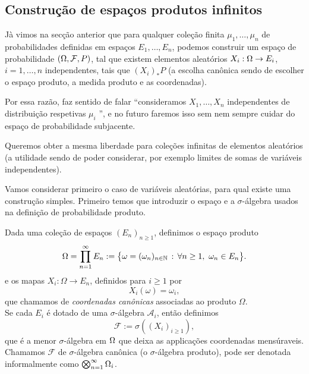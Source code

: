 \begin{topics}


\section{Construção de espaços produtos infinitos}


Jà vimos na secção anterior que para qualquer coleção finita  $\mu_1,\dots,\mu_n$ de probabilidades definidas em espaços
$E_1,\dots,E_n$, podemos construir um espaço de probabilidade $(\Omega,{\mathcal F},P)$, tal que existem elementos aleatórios $X_i:\Omega\to E_i$,
$i=1,\dots,n$ independentes, tais que $(X_i)_*P$ (a escolha canônica sendo de escolher o espaço produto, a medida produto e as coordenadas).

\medskip

Por essa razão, faz sentido de falar ``consideramos $X_1,\dots,X_n$ independentes de distribuição respetivas $\mu_i$ '', e
no futuro faremos isso sem nem sempre cuidar do
espaço de probabilidade subjacente.

\medskip

Queremos obter a mesma liberdade para coleções infinitas de elementos aleatórios
(a utilidade sendo de poder considerar, por exemplo limites de somas de variáveis independentes).

\medskip

Vamos considerar primeiro o caso de variáveis aleatórias, para qual existe uma construção simples.
Primeiro temos que introduzir o espaço e a $\sigma$-álgebra usados na definição de probabilidade produto.

\begin{definition}
Dada uma coleção de espaços $(E_n)_{n\ge 1}$, definimos o espaço produto
\begin{equation}
  \Omega = \prod_{n=1}^{\infty} E_n := \big\{\omega=(\omega_n)_{n\in {\ensuremath{\mathbb N}}} \, : \, \forall n\ge 1, \   \omega_n \in E_n \big\}.
\end{equation}
e os mapas $X_i:\Omega \to E_n$, definidos para $i\ge 1$ por
\begin{equation}
  X_i(\omega) = \omega_i,
\end{equation}
que chamamos de \emph{coordenadas canônicas}  associadas ao produto $\Omega$.\\
Se cada $E_i$ é dotado de uma $\sigma$-álgebra $\mathcal{A}_i$, então definimos
\begin{equation}
  \mathcal{F} := \sigma( (X_i)_{i\geq 1} ),
\end{equation}
que é a menor $\sigma$-álgebra em $\Omega$ que deixa as applicações coordenadas mensúraveis.
Chamamos $\mathcal{F}$ de $\sigma$-álgebra canônica (o $\sigma$-álgebra produto), pode ser denotada informalmente como $\bigotimes_{n=1}^{\infty}\Omega_i$.
\end{definition}


\end{topics}
